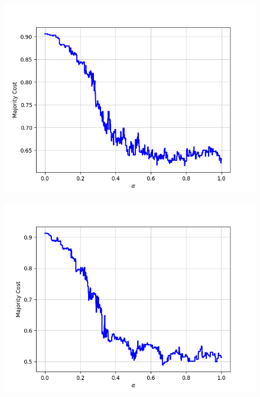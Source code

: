 \begin{figure}[H]
\begin{minipage}{.24\textwidth}
  {\includegraphics[width=\linewidth]{plots/omniglot-intra-sc-cnn/Braille}}
\end{minipage}
\begin{minipage}{.24\textwidth}
  \centering
  {\includegraphics[width=\linewidth]{plots/omniglot-intra-sc-cnn/Burmese_(Myanmar)}}
\end{minipage}
\begin{minipage}{.24\textwidth}
  \centering

\end{minipage}
\end{figure}
